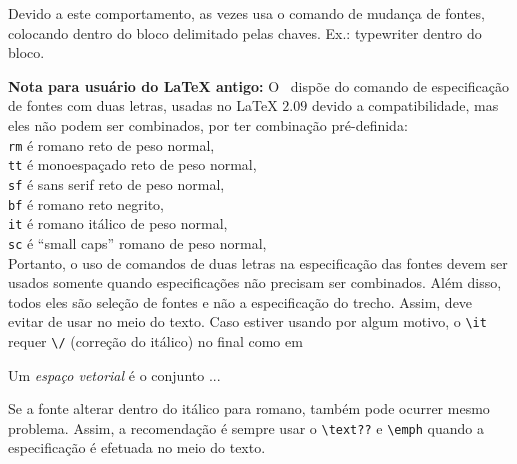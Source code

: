 \documentclass[12pt,a4paper]{article}
\begin{document}
Devido a este comportamento, as vezes usa o comando de mudança de fontes, colocando dentro do bloco delimitado pelas chaves.
Ex.: {\ttfamily typewriter} dentro do bloco.


{\bfseries Nota para usuário do \LaTeX{} antigo:}
O \LaTeXe \ dispõe do comando de especificação de fontes com duas letras, 
usadas no \LaTeX{} $2.09$ devido a compatibilidade, 
mas eles não podem ser combinados, por ter 
combinação pré-definida: \\
 \texttt{rm} é romano reto de peso normal, \\
 \texttt{tt} é monoespaçado reto de peso normal, \\
 \texttt{sf} é sans serif reto de peso normal, \\
 \texttt{bf} é romano reto negrito, \\
 \texttt{it} é romano itálico de peso normal, \\
 \texttt{sc} é ``small caps'' romano de peso normal, \\
 
Portanto, o uso de comandos de duas letras na especificação das fontes 
devem ser usados somente quando especificações não precisam ser combinados.
Além disso, todos eles são seleção de fontes e não a especificação do trecho.
Assim, deve evitar de usar no meio do texto.
Caso estiver usando por algum motivo, o \verb+\it+ requer 
\verb+\/+ (correção do itálico) no final como em

Um {\it espaço vetorial\/} é o conjunto ...

Se a fonte alterar dentro do itálico para romano, também pode ocurrer
mesmo problema. Assim, a recomendação é sempre usar o \verb+\text??+ e
\verb+\emph+ quando a especificação é efetuada no meio do texto.
\end{document}
